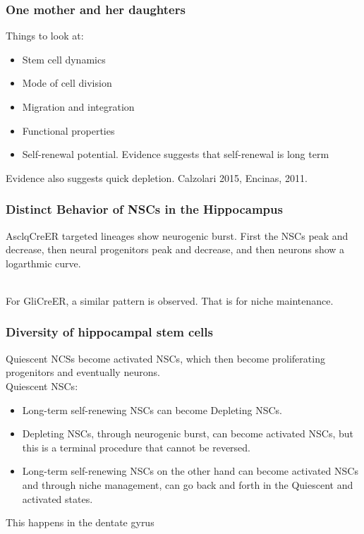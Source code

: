 \begin{itemize}
\begin{itemize}
\subsubsection{One mother and her daughters}
Things to look at:
\begin{itemize}
    \item Stem cell dynamics
    \item Mode of cell division
    \item Migration and integration
    \item Functional properties
    \item Self-renewal potential. Evidence suggests that self-renewal is long term
    
\end{itemize}
Evidence also suggests quick depletion. Calzolari 2015, Encinas, 2011.

\subsubsection{Distinct Behavior of NSCs in the Hippocampus}
AsclqCreER targeted lineages show neurogenic burst. First the NSCs peak and decrease, then neural progenitors peak and decrease, and then neurons show a logarthmic curve.

\\For GliCreER, a similar pattern is observed. That is for niche maintenance.

\subsubsection{Diversity of hippocampal stem cells}
Quiescent NCSs become activated NSCs, which then become proliferating progenitors and eventually neurons. 
\\Quiescent NSCs:
\begin{itemize}
    \item Long-term self-renewing NSCs can become Depleting NSCs.
    \item Depleting NSCs, through neurogenic burst, can become activated NSCs, but this is a terminal procedure that cannot be reversed.
    \item Long-term self-renewing NSCs on the other hand can become activated NSCs and through niche management, can go back and forth in the Quiescent and activated states.
\end{itemize}
This happens in the dentate gyrus

\end{itemize}
\end{itemize}
